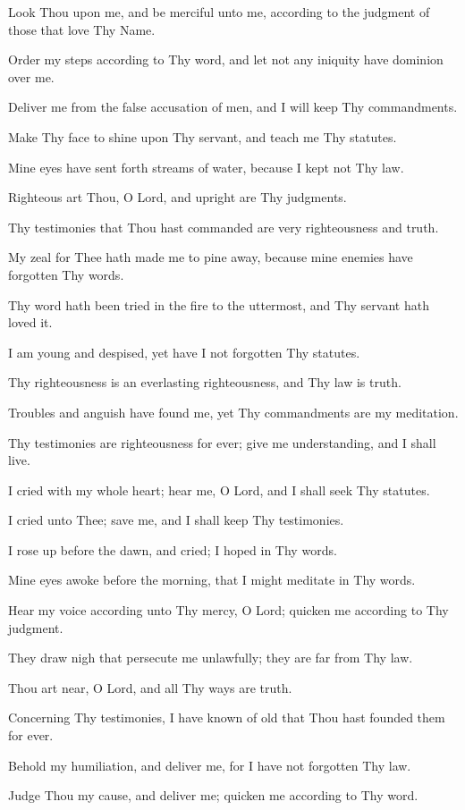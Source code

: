 Look Thou upon me, and be merciful unto me, according to the judgment of those that love Thy Name.

Order my steps according to Thy word, and let not any iniquity have dominion over me.

Deliver me from the false accusation of men, and I will keep Thy commandments.

Make Thy face to shine upon Thy servant, and teach me Thy statutes.

Mine eyes have sent forth streams of water, because I kept not Thy law.

Righteous art Thou, O Lord, and upright are Thy judgments.

Thy testimonies that Thou hast commanded are very righteousness and truth.

My zeal for Thee hath made me to pine away, because mine enemies have forgotten Thy words.

Thy word hath been tried in the fire to the uttermost, and Thy servant hath loved it.

I am young and despised, yet have I not forgotten Thy statutes.

Thy righteousness is an everlasting righteousness, and Thy law is truth.

Troubles and anguish have found me, yet Thy commandments are my meditation.

Thy testimonies are righteousness for ever; give me understanding, and I shall live.

I cried with my whole heart; hear me, O Lord, and I shall seek Thy statutes.

I cried unto Thee; save me, and I shall keep Thy testimonies.

I rose up before the dawn, and cried; I hoped in Thy words.

Mine eyes awoke before the morning, that I might meditate in Thy words.

Hear my voice according unto Thy mercy, O Lord; quicken me according to Thy judgment.

They draw nigh that persecute me unlawfully; they are far from Thy law.

Thou art near, O Lord, and all Thy ways are truth.

Concerning Thy testimonies, I have known of old that Thou hast founded them for ever.

Behold my humiliation, and deliver me, for I have not forgotten Thy law.

Judge Thou my cause, and deliver me; quicken me according to Thy word.

